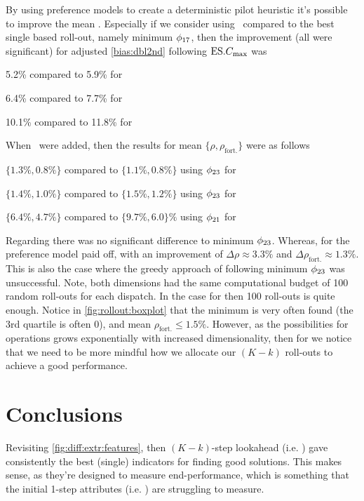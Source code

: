 By using preference models to create a deterministic pilot heuristic it's 
possible to improve the mean \namerho. Especially if we consider using 
\phiSDRRelated\ compared to the best single based roll-out, namely minimum 
$\phi_{17}$, then the improvement (all were significant) for adjusted 
\ref{bias:dbl2nd} following $\text{ES}.{C_{\max}}$ was 
\begin{enumerate*}
    \item 5.2\% compared to 5.9\% for 
    \item 6.4\% compared to 7.7\% for  
    \item 10.1\% compared to 11.8\% for  
\end{enumerate*}
When \phiRNDRelated\ were added, then the results for mean 
$\{\rho,\rho_{\text{fort.}}\}$ were as follows
\begin{enumerate*}
    \item $\{1.3\%,0.8\%\}$ compared to $\{1.1\%,0.8\%\}$ using 
    $\phi_{23}$ for  
    \item $\{1.4\%,1.0\%\}$ compared to $\{1.5\%,1.2\%\}$ using 
    $\phi_{23}$ for  
    \item $\{6.4\%,4.7\%\}$ compared to $\{9.7\%,6.0\}\%$ using 
    $\phi_{21}$ for  
\end{enumerate*}
Regarding \Problem[6\times5]{\train} there was no significant difference to 
minimum $\phi_{23}$. 
Whereas, for  the preference model paid off, with an improvement 
of $\Delta\rho\approx3.3\%$ and $\Delta\rho_{\text{fort.}}\approx1.3\%$.
This is also the case where the greedy approach of following minimum 
$\phi_{23}$ was unsuccessful. Note, both dimensions had the same computational 
budget of 100 random roll-outs for each dispatch. 
In the case for \Problem[6\times5]{\train} then 100 roll-outs is quite enough. 
Notice in \cref{fig:rollout:boxplot} that the minimum is very often found (the 
3rd quartile is often 0), and mean $\rho_{\text{fort.}}\leq1.5\%$.
However, as the possibilities for operations grows exponentially with increased 
dimensionality, then for  we notice that we need to be more 
mindful how we allocate our $(K-k)$ roll-outs to achieve a good performance.

\section{Conclusions}

Revisiting \cref{fig:diff:extr:features}, then $(K-k)$-step lookahead (i.e. 
\phiGlobalRelated) gave consistently the best (single) indicators for finding 
good solutions. 
This makes sense, as they're designed to measure end-performance, which is 
something that the initial 1-step attributes (i.e. \phiLocalRelated) are 
struggling to measure.

